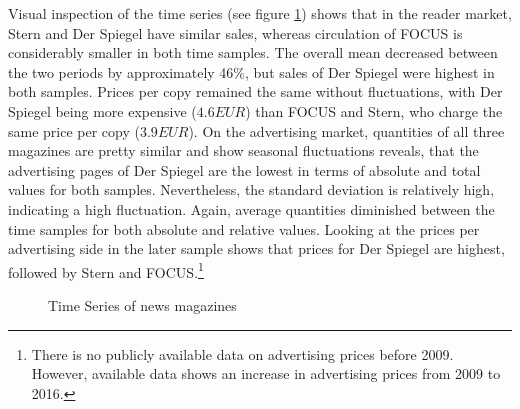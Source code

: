 \documentclass[12pt,a4paper,notitlepage]{article}
\begin{document}
Visual inspection of the time series (see figure \ref{fig_fss}) shows that in the reader market, Stern and Der Spiegel have similar sales, whereas circulation of FOCUS is considerably smaller in both time samples. The overall mean decreased between the two periods by approximately 46$\%$, but sales of Der Spiegel were highest in both samples. Prices per copy remained the same without fluctuations, with Der Spiegel being more expensive ($4.6 EUR$) than FOCUS and Stern, who charge the same price per copy ($3.9 EUR$). On the advertising market, quantities of all three magazines are pretty similar and show seasonal fluctuations reveals, that the advertising pages of Der Spiegel are the lowest in terms of absolute and total values for both samples. Nevertheless, the standard deviation is relatively high, indicating a high fluctuation. Again, average quantities diminished between the time samples for both absolute and relative values. Looking at the prices per advertising side in the later sample shows that prices for Der Spiegel are highest, followed by Stern and FOCUS.\footnote{There is no publicly available data on advertising prices before 2009. However, available data shows an increase in advertising prices from 2009 to 2016.}

\begin{figure}[H]\centering
\caption{Time Series of news magazines}
	\label{fig_fss}
\end{figure}
\end{document}

